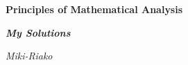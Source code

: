 \begin{titlepage}
    \centering
    \vspace*{60pt}
    {\Huge\bfseries Principles of Mathematical Analysis \par}
    \vspace{60pt}
    {\Large\bfseries\itshape My Solutions \par}
    \vspace{100pt}
    {\Large\itshape Miki-Riako \par}
\end{titlepage}
